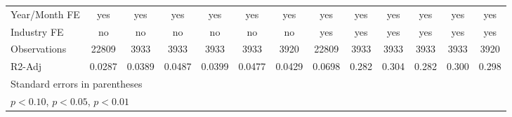 {\begin{tabular}{l*{12}{c}}
\hline
Year/Month FE       &         yes         &         yes         &         yes         &         yes         &         yes         &         yes         &         yes         &         yes         &         yes         &         yes         &         yes         &         yes         \\
Industry FE         &          no         &          no         &          no         &          no         &          no         &          no         &         yes         &         yes         &         yes         &         yes         &         yes         &         yes         \\
Observations        &       22809         &        3933         &        3933         &        3933         &        3933         &        3920         &       22809         &        3933         &        3933         &        3933         &        3933         &        3920         \\
R2-Adj              &      0.0287         &      0.0389         &      0.0487         &      0.0399         &      0.0477         &      0.0429         &      0.0698         &       0.282         &       0.304         &       0.282         &       0.300         &       0.298         \\
\hline\hline
\multicolumn{13}{l}{\footnotesize Standard errors in parentheses}\\
\multicolumn{13}{l}{\footnotesize \sym{*} \(p<0.10\), \sym{**} \(p<0.05\), \sym{***} \(p<0.01\)}\\
\end{tabular}
}
